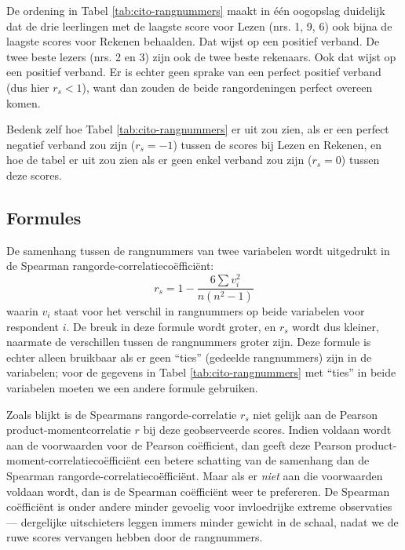 \documentclass[
]{book}
\begin{document}
De ordening in Tabel \ref{tab:cito-rangnummers} maakt in één oogopslag duidelijk dat
de drie leerlingen met de laagste score voor Lezen (nrs. 1, 9, 6) ook
bijna de laagste scores voor Rekenen behaalden. Dat wijst op een
positief verband. De twee beste lezers (nrs. 2 en 3) zijn ook de twee
beste rekenaars. Ook dat wijst op een positief verband. Er is echter
geen sprake van een perfect positief verband (dus hier \(r_s<1\)), want
dan zouden de beide rangordeningen perfect overeen komen.

Bedenk zelf hoe Tabel \ref{tab:cito-rangnummers} er uit zou zien, als er een perfect
negatief verband zou zijn (\(r_s=-1\)) tussen de scores bij Lezen en
Rekenen, en hoe de tabel er uit zou zien als er geen enkel verband zou
zijn (\(r_s=0\)) tussen deze scores.

\hypertarget{formules-4}{%
\subsection{Formules}\label{formules-4}}

De samenhang tussen de rangnummers van twee variabelen wordt uitgedrukt
in de Spearman rangorde-correlatiecoëfficiënt:
\begin{equation}
    r_s = 1 - \frac{6 \sum v_i^2}{n(n^2-1)}
  \label{eq:spearman}
\end{equation}
waarin \(v_i\) staat voor
het verschil in rangnummers op beide variabelen voor respondent \(i\). De
breuk in deze formule wordt groter, en \(r_s\) wordt dus kleiner, naarmate
de verschillen tussen de rangnummers groter zijn.
Deze formule is echter alleen bruikbaar als er geen ``ties'' (gedeelde rangnummers) zijn in de variabelen; voor de gegevens in Tabel \ref{tab:cito-rangnummers} met ``ties'' in beide variabelen moeten we een andere formule gebruiken.

Zoals blijkt is de Spearmans rangorde-correlatie \(r_s\) niet gelijk aan
de Pearson product-momentcorrelatie \(r\) bij deze geobserveerde scores.
Indien voldaan wordt aan de voorwaarden voor de Pearson coëfficient, dan
geeft deze Pearson product-moment-correlatiecoëfficiënt een betere
schatting van de samenhang dan de Spearman
rangorde-correlatiecoëfficiënt. Maar als er \emph{niet} aan die voorwaarden
voldaan wordt, dan is de Spearman coëfficiënt weer te prefereren. De
Spearman coëfficiënt is onder andere minder gevoelig voor invloedrijke
extreme observaties --- dergelijke uitschieters leggen immers minder
gewicht in de schaal, nadat we de ruwe scores vervangen hebben door de
rangnummers.
\end{document}
